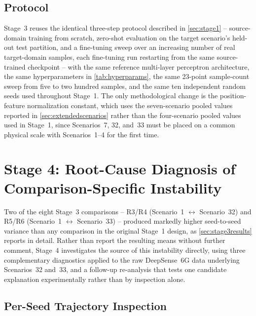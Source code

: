 \documentclass{iutbscthesis}
\begin{document}
\subsection{Protocol}

Stage~3 reuses the identical three-step protocol described in \autoref{sec:stage1} -- source-domain training from scratch, zero-shot evaluation on the target scenario's held-out test partition, and a fine-tuning sweep over an increasing number of real target-domain samples, each fine-tuning run restarting from the same source-trained checkpoint -- with the same reference multi-layer perceptron architecture, the same hyperparameters in \autoref{tab:hyperparams}, the same 23-point sample-count sweep from five to two hundred samples, and the same ten independent random seeds used throughout Stage~1. The only methodological change is the position-feature normalization constant, which uses the seven-scenario pooled values reported in \autoref{sec:extendedscenarios} rather than the four-scenario pooled values used in Stage~1, since Scenarios~7, 32, and~33 must be placed on a common physical scale with Scenarios~1--4 for the first time.

\section{Stage 4: Root-Cause Diagnosis of Comparison-Specific Instability}
\label{sec:stage4}

Two of the eight Stage~3 comparisons -- R3/R4 (Scenario~1 $\leftrightarrow$ Scenario~32) and R5/R6 (Scenario~1 $\leftrightarrow$ Scenario~33) -- produced markedly higher seed-to-seed variance than any comparison in the original Stage~1 design, as \autoref{sec:stage3results} reports in detail. Rather than report the resulting means without further comment, Stage~4 investigates the source of this instability directly, using three complementary diagnostics applied to the raw DeepSense~6G data underlying Scenarios~32 and~33, and a follow-up re-analysis that tests one candidate explanation experimentally rather than by inspection alone.

\subsection{Per-Seed Trajectory Inspection}
\label{sec:stage4perseed}
\end{document}
